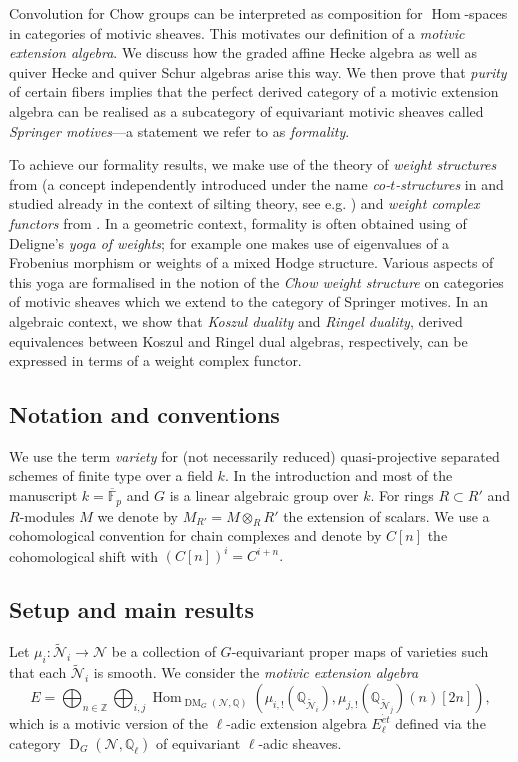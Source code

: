 \documentclass{amsart}
\theoremstyle{plain}
\theoremstyle{TheoremNum}
\theoremstyle{definition}
\theoremstyle{remark}
\numberwithin{equation}{section}
\newcommand{\F}{\mathbb{F}}
\newcommand{\Q}{\mathbb{Q}}
\newcommand{\Z}{\mathbb{Z}}
\newcommand{\M}{\widetilde{\mathcal{N}}}
\newcommand{\N}{\mathcal{N}}
\newcommand{\D}{\operatorname{D}}
\newcommand{\DM}{\operatorname{DM}}
\newcommand{\Hom}{\operatorname{Hom}}
\begin{document}
Convolution for Chow groups can be interpreted as composition for $\Hom$-spaces in categories of motivic sheaves. This motivates our definition of a \emph{motivic extension algebra}. We discuss how the graded affine Hecke algebra as well as quiver Hecke and quiver Schur algebras arise this way.
We then prove that \emph{purity} of certain fibers implies that the perfect derived category of a motivic extension algebra can be realised as a subcategory of equivariant motivic sheaves called \emph{Springer motives}---a statement we refer to as \emph{formality}.

To achieve our formality results, we make use of the theory of \emph{weight structures} from \cite{bondarko_weight_2010} (a concept independently introduced under the name \emph{co-$t$-structures} in \cite{pauksztelloCompactCorigidObjects2008} and studied already in the context of silting theory, see e.g.  \cite{Steffensilting})  and \emph{weight complex functors} from  \cite{bondarko_weight_2010}.
In a geometric context, formality is often obtained using of Deligne's \emph{yoga of weights}; for example one makes use of eigenvalues of a Frobenius morphism or weights of a mixed Hodge structure.
Various aspects of this yoga are formalised in the notion of  the \emph{Chow weight structure} on categories of motivic sheaves which we extend to the category of Springer motives.
In an algebraic context, we show that \emph{Koszul duality} and \emph{Ringel duality}, derived equivalences between  Koszul and Ringel dual algebras, respectively, can be expressed in terms of a weight complex functor.



\subsection*{Notation and conventions}
We use the term \emph{variety} for (not necessarily reduced) quasi-projective separated schemes of finite type over a field $k.$ In the introduction and most of the manuscript $k=\overline{\F}_p$ and $G$ is a linear algebraic group over $k.$ For rings $R\subset R'$ and $R$-modules $M$ we denote by $M_{R'}=M\otimes_RR'$ the extension of scalars. We use a cohomological convention for chain complexes and denote by $C[n]$ the cohomological shift with $(C[n])^i=C^{i+n}.$

\subsection*{Setup and main results} Let $\mu_i: \widetilde{\mathcal{N}}_i\to \N$ be a collection of $G$-equivariant proper maps of varieties such that each $\M_i$ is smooth. We consider the \emph{motivic extension algebra}
$$E=\bigoplus_{n\in \Z}\bigoplus_{i,j}\Hom_{\DM_G(\N,\Q)}(\mu_{i,!}(\Q_{\M_i}),\mu_{j,!}(\Q_{\M_j})(n)[2n]),$$
which is a motivic version of the $\ell$-adic extension algebra $E^{\acute{e}t}_\ell$ defined via the category $\D_G(\N,\Q_\ell)$ of equivariant $\ell$-adic sheaves. 
\end{document}
